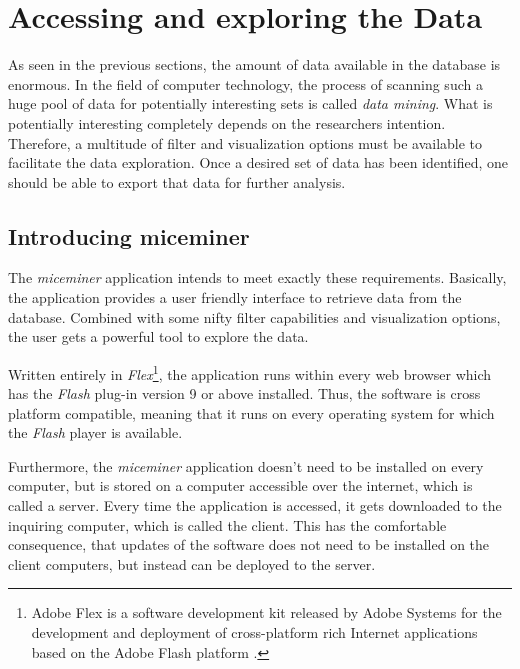 \newpage
\section{Accessing and exploring the Data }
\label{sec:dataaccessandexp}

As seen in the previous sections, the amount of data available in the database is enormous. In the field of computer technology, the process of scanning such a huge pool of data for potentially interesting sets is called \textit{data mining}. What is potentially interesting completely depends on the researchers intention. Therefore, a multitude of filter and visualization options must be available to facilitate the data exploration. Once a desired set of data has been identified, one should be able to export that data for further analysis. 

\subsection{Introducing miceminer}
\label{subsec:dataexp}

The \textit{miceminer} application intends to meet exactly these requirements. Basically, the application provides a user friendly interface to retrieve data from the database. Combined with some nifty filter capabilities and visualization options, the user gets a powerful tool to explore the data.

Written entirely in \textit{Flex}\footnote{Adobe Flex is a software development kit released by Adobe Systems for the development and deployment of cross-platform rich Internet applications based on the Adobe Flash platform \cite{wiki:flex}.}, the application runs within every web browser which has the \textit{Flash} plug-in version 9 or above installed. Thus, the software is cross platform compatible, meaning that it runs on every operating system for which the \textit{Flash} player is available. 

Furthermore, the \textit{miceminer} application doesn't need to be installed on every computer, but is stored on a computer accessible over the internet, which is called a server. Every time the application is accessed, it gets downloaded to the inquiring computer, which is called the client. This has the comfortable consequence, that updates of the software does not need to be installed on the client computers, but instead can be deployed to the server.     


